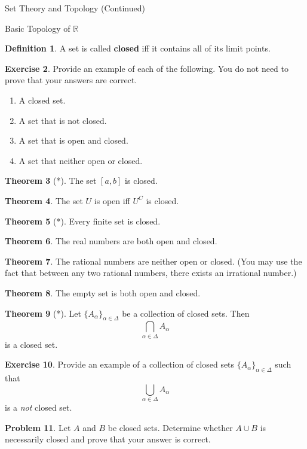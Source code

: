 \documentclass[11pt]{article}
\theoremstyle{definition}
\newtheorem{theorem}{Theorem}[section]
\newtheorem{definition}[theorem]{Definition}
\newtheorem{exercise}[theorem]{Exercise}
\newtheorem{problem}[theorem]{Problem}
\begin{document}
\begin{section}{Set Theory and Topology (Continued)}
\begin{subsection}{Basic Topology of $\mathbb{R}$}
\begin{definition}
A set is called \textbf{closed} iff it contains all of its limit points.
\end{definition}

\begin{exercise}
Provide an example of each of the following.  You do not need to prove that your answers are correct.
\begin{enumerate}
\item A closed set.
\item A set that is not closed.
\item A set that is open and closed.
\item A set that neither open or closed.
\end{enumerate}

\end{exercise}

\begin{theorem}[*]
The set $[a,b]$ is closed.
\end{theorem}

\begin{theorem}
The set $U$ is open iff $U^C$ is closed.
\end{theorem}

\begin{theorem}[*]
Every finite set is closed.
\end{theorem}

\begin{theorem}
The real numbers are both open and closed.
\end{theorem}

\begin{theorem}
The rational numbers are neither open or closed.  (You may use the fact that between any two rational numbers, there exists an irrational number.)
\end{theorem}

\begin{theorem}
The empty set is both open and closed.
\end{theorem}

\begin{theorem}[*]
Let $\{A_{\alpha}\}_{\alpha\in\Delta}$ be a collection of closed sets.  Then
\[
\bigcap_{\alpha\in \Delta} A_{\alpha}
\]
is a closed set.
\end{theorem}

\begin{exercise}
Provide an example of a collection of closed sets $\{A_{\alpha}\}_{\alpha\in\Delta}$ such that 
\[
\bigcup_{\alpha\in \Delta} A_{\alpha}
\]
is a \emph{not} closed set.
\end{exercise}

\begin{problem}
Let $A$ and $B$ be closed sets.  Determine whether $A\cup B$ is necessarily closed and prove that your answer is correct.
\end{problem}

\end{subsection}

\end{section}
\end{document}
